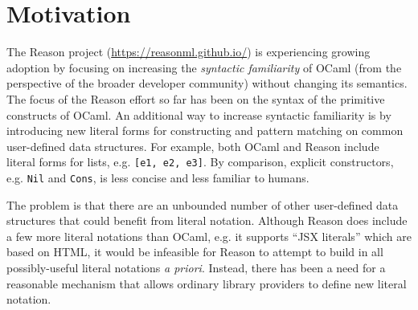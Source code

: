 \documentclass[acmsmall,review]{acmart}
\newcommand{\li}[1]{\lstinline[basicstyle=\ttfamily\fontsize{9pt}{1em}\selectfont]{#1}}
\theoremstyle{slplain}
\numberwithin{thm}{section}
\begin{document}




\maketitle
\thispagestyle{empty} %

\section{Motivation}

The Reason project (\url{https://reasonml.github.io/}) is experiencing growing adoption by focusing on increasing the \emph{syntactic familiarity} of OCaml (from the perspective of the broader developer community) without changing its semantics. The focus of the Reason effort so far has been on the syntax of the primitive constructs of OCaml. An additional way to increase syntactic familiarity is by introducing new {literal forms} for constructing and pattern matching on  common user-defined data structures. For example, both OCaml and Reason include literal forms for lists, e.g. \li{[e1, e2, e3]}. By comparison, explicit constructors, e.g. \li{Nil} and \li{Cons}, is less concise and less familiar to humans.

The problem is that there are an  unbounded number of other user-defined data structures that could benefit from literal notation. Although Reason does include a few more literal notations than OCaml, e.g. it supports ``JSX literals'' which are based on HTML, it would be infeasible for Reason to attempt to build in all possibly-useful literal notations \emph{a priori}. Instead, there has been a need for a reasonable mechanism that allows ordinary library providers to define new literal notation.
\end{document}
